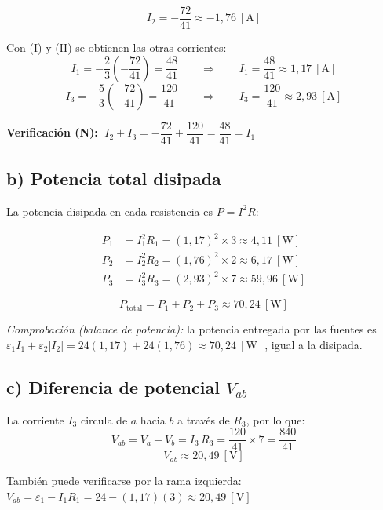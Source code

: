 \documentclass[12pt,letterpaper]{article}
\begin{document}
\[
    \boxed{I_2 = -\frac{72}{41} \approx -1{,}76\ [\text{A}]}
\]

Con (I) y (II) se obtienen las otras corrientes:
\[
    I_1 = -\frac{2}{3}\left(-\frac{72}{41}\right) = \frac{48}{41}
    \qquad\Rightarrow\qquad
    \boxed{I_1 = \frac{48}{41} \approx 1{,}17\ [\text{A}]}
\]
\[
    I_3 = -\frac{5}{3}\left(-\frac{72}{41}\right) = \frac{120}{41}
    \qquad\Rightarrow\qquad
    \boxed{I_3 = \frac{120}{41} \approx 2{,}93\ [\text{A}]}
\]

\noindent\textbf{Verificaci\'on (N):}
$\;I_2 + I_3 = -\dfrac{72}{41} + \dfrac{120}{41} = \dfrac{48}{41} = I_1$ \checkmark

\subsection*{b) Potencia total disipada}

La potencia disipada en cada resistencia es $P = I^2 R$:

\begin{align*}
    P_1 &= I_1^2 R_1 = (1{,}17)^2 \times 3 \approx 4{,}11\ [\text{W}] \\
    P_2 &= I_2^2 R_2 = (1{,}76)^2 \times 2 \approx 6{,}17\ [\text{W}] \\
    P_3 &= I_3^2 R_3 = (2{,}93)^2 \times 7 \approx 59{,}96\ [\text{W}]
\end{align*}

\[
    \boxed{P_{\text{total}} = P_1 + P_2 + P_3 \approx 70{,}24\ [\text{W}]}
\]

\noindent\small\textit{Comprobaci\'on (balance de potencia):} la potencia entregada por las fuentes
es $\varepsilon_1 I_1 + \varepsilon_2 |I_2| = 24(1{,}17) + 24(1{,}76) \approx 70{,}24\ [\text{W}]$,
igual a la disipada. \checkmark
\normalsize

\subsection*{c) Diferencia de potencial $V_{ab}$}

La corriente $I_3$ circula de $a$ hacia $b$ a trav\'es de $R_3$, por lo que:
\[
    V_{ab} = V_a - V_b = I_3 \, R_3 = \frac{120}{41}\times 7 = \frac{840}{41}
\]
\[
    \boxed{V_{ab} \approx 20{,}49\ [\text{V}]}
\]

\noindent Tambi\'en puede verificarse por la rama izquierda:
$V_{ab} = \varepsilon_1 - I_1 R_1 = 24 - (1{,}17)(3) \approx 20{,}49\ [\text{V}]$ \checkmark
\end{document}
